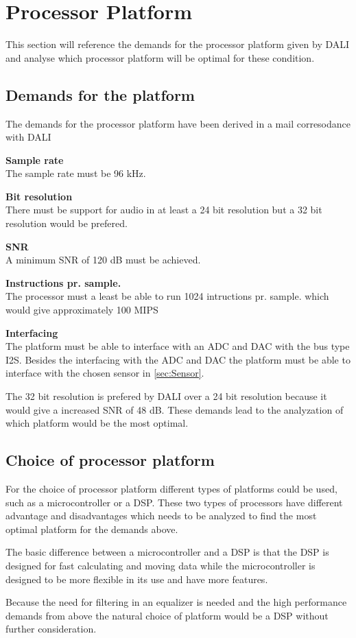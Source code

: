 \section{Processor Platform}
This section will reference the demands for the processor platform given by DALI and analyse which processor platform will be optimal for these condition. 

\subsection*{Demands for the platform}
The demands for the processor platform have been derived in a mail corresodance with DALI 

\textbf{Sample rate} \\
The sample rate must be 96 kHz. 

\textbf{Bit resolution} \\
There must be support for audio in at least a 24 bit resolution but a 32 bit resolution would be prefered.

\textbf{\gls{SNR}} \\
A minimum \gls{SNR} of 120 dB must be achieved.

\textbf{Instructions pr. sample.} \\
The processor must a least be able to run 1024 intructions pr. sample. which would give approximately 100 \gls{MIPS}

\textbf{Interfacing} \\
The platform must be able to interface with an ADC and DAC with the bus type \gls{I2S}. Besides the interfacing with the ADC and DAC the platform must be able to interface with the chosen sensor in \autoref{sec:Sensor}.

The 32 bit resolution is prefered by DALI over a 24 bit resolution because it would give a increased \gls{SNR} of 48 dB. These demands lead to the analyzation of which platform would be the most optimal.   

\subsection*{Choice of processor platform}
For the choice of processor platform different types of platforms could be used, such as a microcontroller or a \gls{DSP}. These two types of processors have different advantage and disadvantages which needs to be analyzed to find the most optimal platform for the demands above.

The basic difference between a microcontroller and a \gls{DSP} is that the \gls{DSP} is designed for fast calculating and moving data while the microcontroller is designed to be more flexible in its use and have more features.

Because the need for filtering in an equalizer is needed and the high performance demands from above the natural choice of platform would be a \gls{DSP} without further consideration.     




